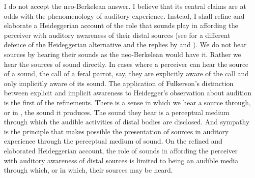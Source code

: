 I do not accept the neo-Berkelean answer. I believe that its central claims are at odds with the phenomenology of auditory experience. Instead, I shall refine and elaborate a Heideggerian account of the role that sounds play in affording the perceiver with auditory awareness of their distal sources (see \citealt{Leddington:2014aa} for a different defence of the Heideggerian alternative and the replies by \citealt{OCallaghan:2014aa} and \citealt{Nudds:2014aa}). We do not hear sources by hearing their sounds as the neo-Berkelean would have it. Rather we hear the sources of sound directly. In cases where a perceiver can hear the source of a sound, the call of a feral parrot, say, they are explicitly aware of the call and only implicitly aware of its sound. The application of Fulkerson's \citeyearpar{Fulkerson:2014ek} distinction between explicit and implicit awareness to Heidegger's \citeyearpar{Heidegger:1935uq} observation about audition is the first of the refinements. There is a sense in which we hear a source through, or in \citep{Leddington:2014aa}, the sound it produces. The sound they hear is a perceptual medium through which the audible activities of distal bodies are disclosed. And sympathy is the principle that makes possible the presentation of sources in auditory experience through the perceptual medium of sound. On the refined and elaborated Heideggerian account, the role of sounds in affording the perceiver with auditory awareness of distal sources is limited to being an audible media through which, or in which, their sources may be heard.



